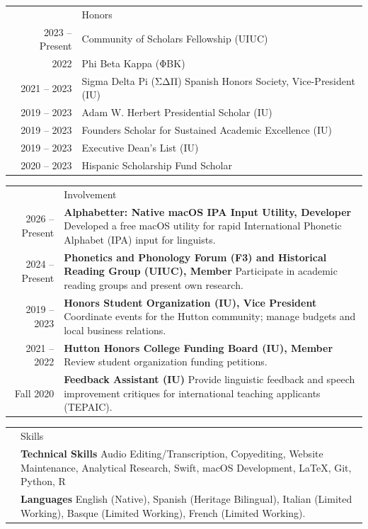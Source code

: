 \documentclass[letterpaper, 11pt]{article}
\newcommand{\headingfont}{\Large\color{accentcolor}}
\newenvironment{SectionTable}[1]{
	\setlength{\LTpre}{0pt}
	\setlength{\LTpost}{0pt}
	\renewcommand*{\arraystretch}{1.4}
	\setlength{\tabcolsep}{10pt}
	\begin{longtable}{Rp{5.9in}} & #1 \\}
{\end{longtable}\vspace{0.25cm}}
\newenvironment{SectionTableSingleSpace}[1]{
	\setlength{\LTpre}{0pt}
	\setlength{\LTpost}{0pt}
	\renewcommand*{\arraystretch}{1.2}
	\setlength{\tabcolsep}{10pt}
	\begin{longtable}{Rp{5.9in}} & #1 \\}
{\end{longtable}\vspace{0.25cm}}
\begin{document}

\begin{SectionTableSingleSpace}{\headingfont Honors}
	2023 -- Present & Community of Scholars Fellowship (UIUC) \\
	2022 & Phi Beta Kappa (ΦΒΚ) \\
	2021 -- 2023 & Sigma Delta Pi (ΣΔΠ) Spanish Honors Society, Vice-President (IU) \\
	2019 -- 2023 & Adam W. Herbert Presidential Scholar (IU) \\
	2019 -- 2023 & Founders Scholar for Sustained Academic Excellence (IU) \\
	2019 -- 2023 & Executive Dean's List (IU) \\
	2020 -- 2023 & Hispanic Scholarship Fund Scholar
\end{SectionTableSingleSpace}


\begin{SectionTable}{\headingfont Involvement}
	2026 -- Present &
	\textbf{Alphabetter: Native macOS IPA Input Utility, Developer} \newline
	Developed a free macOS utility for rapid International Phonetic Alphabet (IPA) input for linguists. \\

	2024 -- Present &
	\textbf{Phonetics and Phonology Forum (F3) and Historical Reading Group (UIUC), Member} \newline
	Participate in academic reading groups and present own research. \\

	2019 -- 2023 &
	\textbf{Honors Student Organization (IU), Vice President} \newline
	Coordinate events for the Hutton community; manage budgets and local business relations. \\

	2021 -- 2022 &
	\textbf{Hutton Honors College Funding Board (IU), Member} \newline
	Review student organization funding petitions. \\

	Fall 2020 &
	\textbf{Feedback Assistant (IU)} \newline
	Provide linguistic feedback and speech improvement critiques for international teaching applicants (TEPAIC).
\end{SectionTable}


\begin{SectionTable}{\headingfont Skills}
	& \textbf{Technical Skills} \newline
	Audio Editing/Transcription, Copyediting, Website Maintenance, Analytical Research, Swift, macOS Development, \LaTeX, Git, Python, R \\

	& \textbf{Languages} \newline
	English (Native), Spanish (Heritage Bilingual), Italian (Limited Working), Basque (Limited Working), French (Limited Working).
\end{SectionTable}

\end{document}
